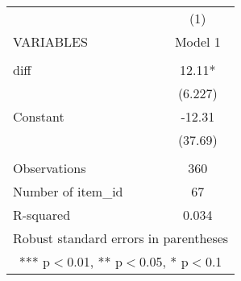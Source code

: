 \documentclass[]{article}
\begin{document}
\begin{tabular}{lc} \hline
 & (1) \\
VARIABLES & Model 1 \\ \hline
 &  \\
diff & 12.11* \\
 & (6.227) \\
Constant & -12.31 \\
 & (37.69) \\
 &  \\
Observations & 360 \\
Number of item\_id & 67 \\
 R-squared & 0.034 \\ \hline
\multicolumn{2}{c}{ Robust standard errors in parentheses} \\
\multicolumn{2}{c}{ *** p$<$0.01, ** p$<$0.05, * p$<$0.1} \\
\end{tabular}
\end{document}
